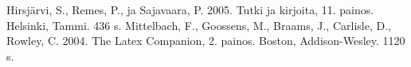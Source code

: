 \documentclass[12pt,a4paper,finnish]{tutthesis}
\begin{document}
\newpage
{} %
\renewcommand{\bibname}{References} 
\begin{thebibliography}{99}
 Hirsjärvi, S., Remes, P., ja Sajavaara, P. 2005. Tutki ja
  kirjoita, 11. painos. Helsinki, Tammi. 436 s. 
 Mittelbach, F., Goossens, M., Braams, J., 
Carlisle, D., Rowley, C. 2004. The Latex Companion, 2. painos. Boston, Addison-Wesley. 1120 s.
 
\end{thebibliography}
 
%
%
 
 
\end{document}
